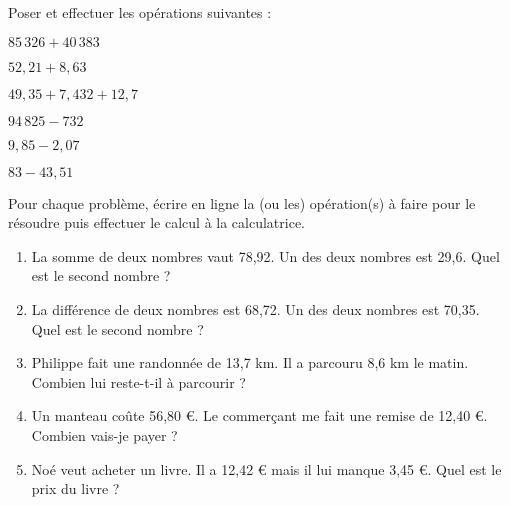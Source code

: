 \begin{colonne*exercice}
\begin{exercice}
   Poser et effectuer les opérations suivantes :
   \begin{colenumerate}{2}
      \item $85\,326+40\,383$
      \item $52,21+8,63$
      \item $49,35+7,432+12,7$
      \item $94\,825-732 $
      \item $9,85-2,07$
      \item $83-43,51$
   \end{colenumerate}
\end{exercice}

\medskip


\begin{exercice}
   Pour chaque problème, écrire en ligne la (ou les) opération(s) à faire pour le résoudre puis effectuer le calcul à la calculatrice.
   \begin{enumerate}
      \item La somme de deux nombres vaut 78,92. Un des deux nombres est 29,6. Quel est le second nombre ?
      \item La différence de deux nombres est 68,72. Un des deux nombres est 70,35. Quel est le second nombre ?
      \item Philippe fait une randonnée de 13,7 km. Il a parcouru 8,6 km le matin.
Combien lui reste-t-il à parcourir ?
      \item Un manteau coûte 56,80 \euro. Le commerçant me fait une remise de 12,40 \euro. Combien vais-je payer ?
      \item Noé veut acheter un livre. Il a 12,42 \euro{} mais il lui manque 3,45 \euro{}. Quel est le prix du livre ?   
   \end{enumerate}
\end{exercice}




\end{colonne*exercice}
